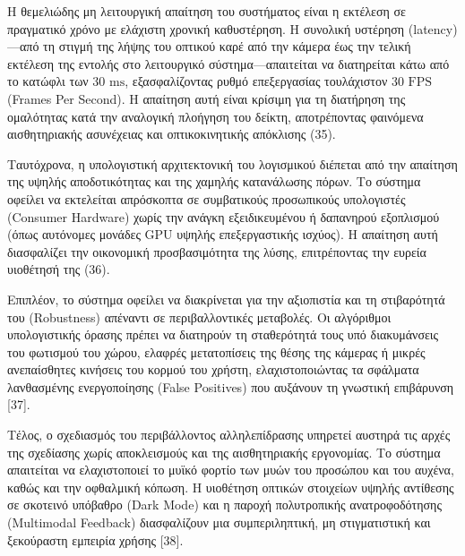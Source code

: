\documentclass[twoside, a4paper, 11pt]{article}
\newcommand{\textlatin}[1]{\textenglish{#1}}
\begin{document}
Η θεμελιώδης μη λειτουργική απαίτηση του συστήματος είναι η εκτέλεση σε πραγματικό χρόνο με ελάχιστη χρονική καθυστέρηση. Η συνολική υστέρηση (\textlatin{latency})—από τη στιγμή της λήψης του οπτικού καρέ από την κάμερα έως την τελική εκτέλεση της εντολής 
στο λειτουργικό σύστημα—απαιτείται να διατηρείται κάτω από το κατώφλι των $30\text{ ms}$, εξασφαλίζοντας ρυθμό επεξεργασίας τουλάχιστον $30\text{ FPS}$ (\textlatin{Frames Per Second}). Η απαίτηση αυτή είναι κρίσιμη για τη διατήρηση της ομαλότητας κατά την αναλογική πλοήγηση του δείκτη, 
αποτρέποντας φαινόμενα αισθητηριακής ασυνέχειας και οπτικοκινητικής απόκλισης (35).

Ταυτόχρονα, η υπολογιστική αρχιτεκτονική του λογισμικού διέπεται από την απαίτηση της υψηλής αποδοτικότητας και της χαμηλής κατανάλωσης πόρων. 
Το σύστημα οφείλει να εκτελείται απρόσκοπτα σε συμβατικούς προσωπικούς υπολογιστές (\textlatin{Consumer Hardware}) χωρίς την ανάγκη εξειδικευμένου ή δαπανηρού εξοπλισμού (όπως αυτόνομες μονάδες GPU υψηλής επεξεργαστικής ισχύος).
Η απαίτηση αυτή διασφαλίζει την οικονομική προσβασιμότητα της λύσης, επιτρέποντας την ευρεία υιοθέτησή της (36).

Επιπλέον, το σύστημα οφείλει να διακρίνεται για την αξιοπιστία και τη στιβαρότητά του (\textlatin{Robustness}) απέναντι σε περιβαλλοντικές μεταβολές.
 Οι αλγόριθμοι υπολογιστικής όρασης πρέπει να διατηρούν τη σταθερότητά τους υπό διακυμάνσεις του φωτισμού του χώρου, ελαφρές μετατοπίσεις της θέσης της κάμερας ή μικρές ανεπαίσθητες κινήσεις του κορμού του χρήστη, ελαχιστοποιώντας 
 τα σφάλματα λανθασμένης ενεργοποίησης (\textlatin{False Positives}) που αυξάνουν τη γνωστική επιβάρυνση [37].

Τέλος, ο σχεδιασμός του περιβάλλοντος αλληλεπίδρασης υπηρετεί αυστηρά τις αρχές της σχεδίασης χωρίς αποκλεισμούς και της αισθητηριακής εργονομίας. 
Το σύστημα απαιτείται να ελαχιστοποιεί το μυϊκό φορτίο των μυών του προσώπου και του αυχένα, καθώς και την οφθαλμική κόπωση. Η υιοθέτηση οπτικών στοιχείων υψηλής αντίθεσης σε σκοτεινό υπόβαθρο (\textlatin{Dark Mode}) και η παροχή πολυτροπικής ανατροφοδότησης (\textlatin{Multimodal Feedback}) 
διασφαλίζουν μια συμπεριληπτική, μη στιγματιστική και ξεκούραστη εμπειρία χρήσης [38].
\end{document}
